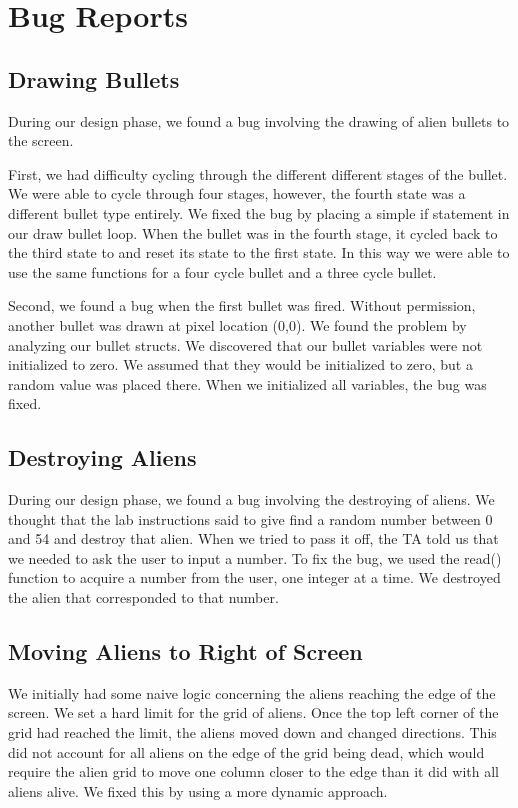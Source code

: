 \documentclass[11pt,letter,oneside]{report}
\begin{document}
\section{Bug Reports}

\subsection{Drawing Bullets}
During our design phase, we found a bug involving the drawing of alien bullets to the screen. 

First, we had difficulty cycling through the different different stages of the bullet. We were able to cycle through four stages, however, the fourth state was a different bullet type entirely. We fixed the bug by placing a simple if statement in our draw bullet loop. When the bullet was in the fourth stage, it cycled back to the third state to and reset its state to the first state. In this way we were able to use the same functions for a four cycle bullet and a three cycle bullet.

Second, we found a bug when the first bullet was fired. Without permission, another bullet was drawn at pixel location (0,0). We found the problem by analyzing our bullet structs. We discovered that our bullet variables were not initialized to zero. We assumed that they would be initialized to zero, but a random value was placed there. When we initialized all variables, the bug was fixed.

\subsection{Destroying Aliens}
During our design phase, we found a bug involving the destroying of aliens. We thought that the lab instructions said to give find a random number between 0 and 54 and destroy that alien. When we tried to pass it off, the TA told us that we needed to ask the user to input a number. To fix the bug, we used the read() function to acquire a number from the user, one integer at a time. We destroyed the alien that corresponded to that number.

\subsection{Moving Aliens to Right of Screen}
We initially had some naive logic concerning the aliens reaching the edge of the screen.  We set a hard limit for the grid of aliens.  Once the top left corner of the grid had reached the limit, the aliens moved down and changed directions.  This did not account for all aliens on the edge of the grid being dead, which would require the alien grid to move one column closer to the edge than it did with all aliens alive.  We fixed this by using a more dynamic approach.
\end{document}
